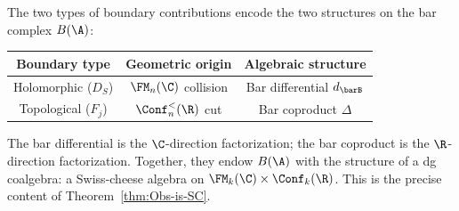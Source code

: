 \begin{remark}
The two types of boundary contributions
encode the two structures on the bar complex $B(\A)$:
\begin{center}
\renewcommand{\arraystretch}{1.2}
\begin{tabular}{c|c|c}
\textbf{Boundary type} & \textbf{Geometric origin}
 & \textbf{Algebraic structure} \\
\hline
Holomorphic ($D_S$) & $\FM_n(\C)$ collision
 & Bar differential $d_{\barB}$ \\
Topological ($F_j$) & $\Conf_n^<(\R)$ cut
 & Bar coproduct $\Delta$
\end{tabular}
\end{center}
The bar differential is the $\C$-direction
factorization; the bar coproduct is the $\R$-direction
factorization. Together, they endow $B(\A)$ with
the structure of a dg coalgebra: a Swiss-cheese
algebra on $\FM_k(\C) \times \Conf_k(\R)$.
This is the precise content of
Theorem~\ref{thm:Obs-is-SC}.


\end{remark}
